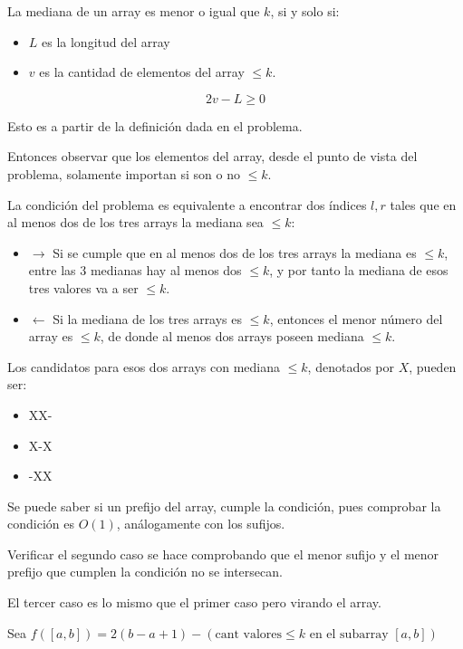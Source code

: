 \documentclass[14pt]{extarticle}
\begin{document}
La mediana de un array es menor o igual que \( k \), si y solo si:

\begin{itemize}
    \item \( L \) es la longitud del array
    \item \( v \) es la cantidad de elementos del array \( \leq k \).
\end{itemize}

\[ 2v - L \geq 0 \]

Esto es a partir de la definición dada en el problema.

Entonces observar que los elementos del array, desde el punto de vista del problema, solamente importan si son o no \( \leq k \).

La condición del problema es equivalente a encontrar dos índices \( l, r \) tales que en al menos dos de los tres arrays la mediana sea \( \leq k \):

\begin{itemize}
    \item \( \rightarrow \) Si se cumple que en al menos dos de los tres arrays la mediana es \( \leq k \), entre las 3 medianas hay al menos dos \( \leq k \), y por tanto la mediana de esos tres valores va a ser \( \leq k \).
    \item \( \leftarrow \) Si la mediana de los tres arrays es \( \leq k \), entonces el menor número del array es \( \leq k \), de donde al menos dos arrays poseen mediana \( \leq k \).
\end{itemize}

Los candidatos para esos dos arrays con mediana \( \leq k \), denotados por \( X \), pueden ser:

\begin{itemize}
    \item XX-
    \item X-X
    \item -XX
\end{itemize}

Se puede saber si un prefijo del array, cumple la condición, pues comprobar la condición es \( O(1) \), análogamente con los sufijos.

Verificar el segundo caso se hace comprobando que el menor sufijo y el menor prefijo que cumplen la condición no se intersecan.

El tercer caso es lo mismo que el primer caso pero virando el array.

Sea \( f([a, b]) = 2(b-a+1) - (\text{cant valores} \leq k \text{ en el subarray } [a, b]) \)
\end{document}
